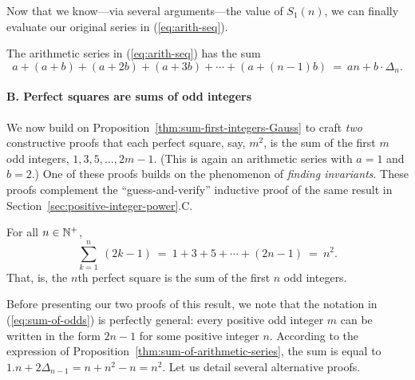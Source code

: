 \medskip

Now that we know---via several arguments---the value of $S_1(n)$, we
can finally evaluate our original series in (\ref{eq:arith-seq}).

\begin{prop}
\label{thm:sum-of-arithmetic-series}
The arithmetic series in (\ref{eq:arith-seq}) has the sum
\[
a + (a+b) + (a+2b) + (a+3b) + \cdots + (a+(n-1)b) \ = \
an + b \cdot \Delta_n. 
\]
\end{prop}


\paragraph{\small\sf B. Perfect squares are sums of odd integers}

We now build on Proposition~\ref{thm:sum-first-integers-Gauss} to
craft {\em two} constructive proofs that each perfect square, say,
$m^2$, is the sum of the first $m$ odd integers, $1, 3, 5, \ldots,
2m-1$.  (This is again an arithmetic series with $a=1$ and $b=2$.)
One of these proofs builds on the phenomenon of {\em finding
  invariants}.  These proofs complement the ``guess-and-verify''
inductive proof of the same result in
Section~\ref{sec:positive-integer-power}.C.

\begin{prop}
\label{thm:squares-odd-integers-Gauss}
For all $n \in \mathbb{N}^+$,
\begin{equation}
\label{eq:sum-of-odds}
\sum_{k=1}^n \ (2k-1)
 \ = \ 1 + 3 + 5 + \cdots + (2n-1) \ = \ n^2.
\end{equation}
That, is, the $n$th perfect square is the sum of the first $n$ odd
integers.
\end{prop}

Before presenting our two proofs of this result, we note that the
notation in (\ref{eq:sum-of-odds}) is perfectly general: every positive
odd integer $m$ can be written in the form $2n-1$ for some positive
integer $n$.
{\Denis According to the expression of Proposition~\ref{thm:sum-of-arithmetic-series},
the sum is equal to $1.n + 2 \Delta_{n-1} = n + n^2 -n = n^2$.
Let us detail several alternative proofs.}

\smallskip

